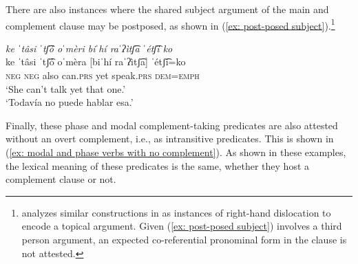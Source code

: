 There are also instances where the shared subject argument of the main and complement clause may be postposed, as shown in (\ref{ex: post-posed subject}).\footnote{\citet{moralesmoreno2016rochecahi} analyzes similar constructions in  as instances of right-hand dislocation to encode a topical argument. Given (\ref{ex: post-posed subject}) involves a third person argument, an expected co-referential pronominal form in the clause is not attested.}

\ea\label{ex: post-posed subject}

    \textit{ke ˈtâsi ˈtʃ͡ó oˈmèri biˈhí raˈʔìtʃ͡a ˈétʃ͡i ko}\\
    \gll    ke ˈtâsi ˈtʃ͡ó oˈmèra [biˈhí raˈʔìtʃ͡a] ˈétʃ͡i=ko\\
            \textsc{neg} \textsc{neg} also can.\textsc{prs} yet speak.\textsc{prs} \textsc{dem=emph}\\
    \glt    `She can't talk yet that one.'\\
    \glt    `Todavía no puede hablar esa.'   \\

\z

Finally, these phase and modal complement-taking predicates are also attested without an overt complement, i.e., as intransitive predicates. This is shown in (\ref{ex: modal and phase verbs with no complement}). As shown in these examples, the lexical meaning of these predicates is the same, whether they host a complement clause or not.

\ea\label{ex: modal and phase verbs with no complement}

